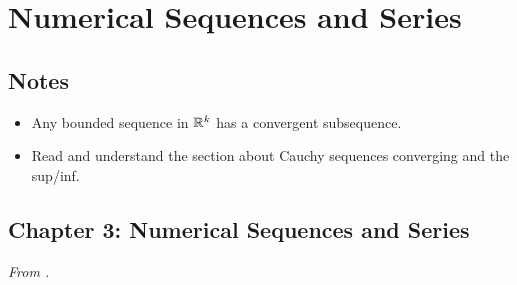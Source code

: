 \documentclass[../../notes.tex]{subfiles}
\begin{document}
\chapter{Numerical Sequences and Series}
\section{Notes}
\begin{itemize}
    \item {}Any bounded sequence in $\mathbb{R}^k$ has a convergent subsequence.
    \item {}Read and understand the section about Cauchy sequences converging and the sup/inf.
\end{itemize}



\section{Chapter 3: Numerical Sequences and Series}
\emph{From \textcite{bib:Rudin}.}
\end{document}
